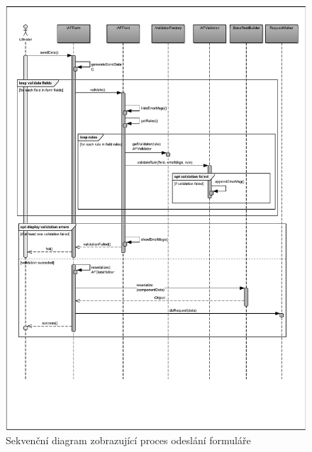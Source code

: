 \begin{figure}
\begin{center}
\includegraphics[width=\textwidth, height=\textheight, keepaspectratio, trim=8 8 8 8, clip]{figures/sequenceSendForm}
\caption{Sekvenční diagram zobrazující proces odeslání formuláře}
\label{img:sdFormSend}
\end{center}
\end{figure}

